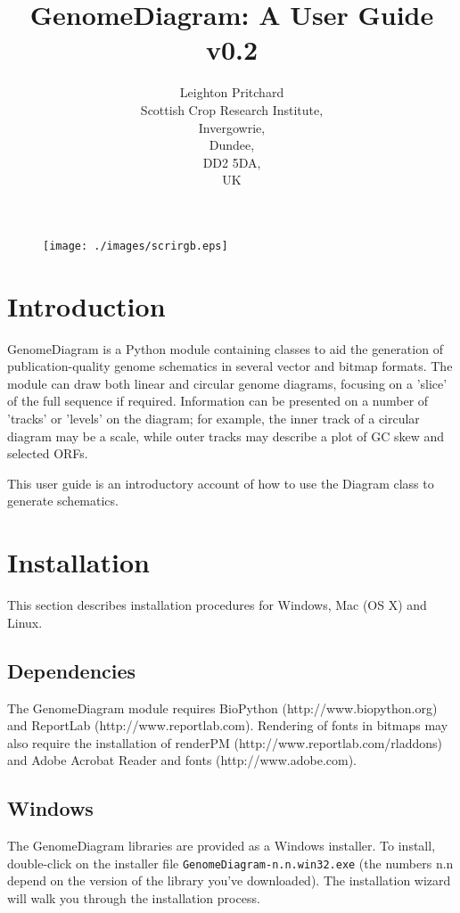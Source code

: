 \documentclass{article}
\author{Leighton Pritchard \\ Scottish Crop Research Institute, \\
Invergowrie, \\ Dundee, \\ DD2 5DA, \\ UK}
\title{GenomeDiagram: A User Guide \\ v0.2}
\begin{document}
\maketitle                  %

\begin{figure}[hptb]
\begin{center}
 \texttt{[image: ./images/scrirgb.eps]}\\
\end{center}
\end{figure}

\tableofcontents

\section{Introduction}
GenomeDiagram is a Python module containing classes to aid the
generation of publication-quality genome schematics in several
vector and bitmap formats. The module can draw both linear and
circular genome diagrams, focusing on a 'slice' of the full
sequence if required. Information can be presented on a number of
'tracks' or 'levels' on the diagram; for example, the inner track
of a circular diagram may be a scale, while outer tracks may
describe a plot of GC skew and selected ORFs.

This user guide is an introductory account of how to use the
Diagram class to generate schematics.

\section{Installation}
This section describes installation procedures for Windows, Mac
(OS X) and Linux.

\subsection{Dependencies} The GenomeDiagram module requires
BioPython (http://www.biopython.org) and ReportLab
(http://www.reportlab.com).  Rendering of fonts in bitmaps may
also require the installation of \us renderPM
(http://www.reportlab.com/rl\us addons) and Adobe Acrobat Reader
and fonts (http://www.adobe.com).

\subsection{Windows}
The GenomeDiagram libraries are provided as a Windows installer.
To install, double-click on the installer file
\texttt{GenomeDiagram-n.n.win32.exe} (the numbers n.n depend on
the version of the library you've downloaded).  The installation
wizard will walk you through the installation process.
\end{document}
